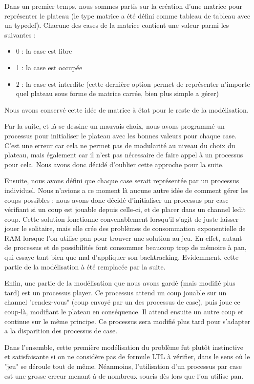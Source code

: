 \documentclass[12pt, a4paper]{report}
\begin{document}
Dans un premier temps, nous sommes partis sur la création d'une matrice pour représenter le plateau (le type matrice a été défini comme tableau de tableau avec un typedef). Chacune des cases de la matrice contient une valeur parmi les suivantes :
\begin{itemize}
\item 0 : la case est libre
\item 1 : la case est occupée
\item 2 : la case est interdite (cette dernière option permet de représenter n'importe quel plateau sous forme de matrice carrée, bien plus simple a gérer)
\end{itemize}
Nous avons conservé cette idée de matrice à état pour le reste de la modélisation.

Par la suite, et là se dessine un mauvais choix, nous avons programmé un processus pour initialiser le plateau avec les bonnes valeurs pour chaque case. C'est une erreur car cela ne permet pas de modularité au niveau du choix du plateau, mais également car il n'est pas nécessaire de faire appel à un processus pour cela. Nous avons donc décidé d'oublier cette approche pour la suite.

Ensuite, nous avons défini que chaque case serait représentée par un processus individuel. Nous n'avions a ce moment là aucune autre idée de comment gérer les coups possibles : nous avons donc décidé d'initialiser un processus par case vérifiant si un coup est jouable depuis celle-ci, et de placer dans un channel ledit coup. Cette solution fonctionne convenablement lorsqu'il s'agit de juste laisser jouer le solitaire, mais elle crée des problèmes de consommation exponentielle de RAM lorsque l'on utilise pan pour trouver une solution au jeu. En effet, autant de processus et de possibilités font consommer beaucoup trop de mémoire à pan, qui essaye tant bien que mal d'appliquer son backtracking. Evidemment, cette partie de la modélisation à été remplacée par la suite.

Enfin, une partie de la modélisation que nous avons gardé (mais modifié plus tard) est un processus player. Ce processus attend un coup jouable sur un channel "rendez-vous" (coup envoyé par un des processus de case), puis joue ce coup-là, modifiant le plateau en conséquence. Il attend ensuite un autre coup et continue sur le même principe. Ce processus sera modifié plus tard pour s'adapter a la disparition des processus de case.

Dans l'ensemble, cette première modélisation du problème fut plutôt instinctive et satisfaisante si on ne considère pas de formule LTL à vérifier, dans le sens où le "jeu" se déroule tout de même. Néanmoins, l'utilisation d'un processus par case est une grosse erreur menant à de nombreux soucis dès lors que l'on utilise pan.
\end{document}

